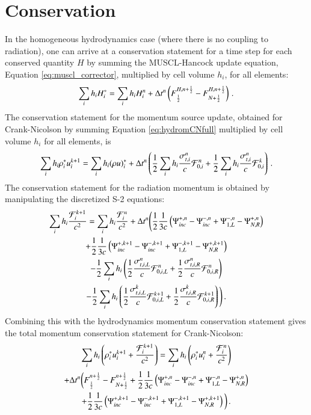 \section{Conservation}
In the homogeneous hydrodynamics case (where there is no coupling to radiation),
one can arrive at a conservation statement for a time step for each conserved
quantity $H$ by summing the MUSCL-Hancock update equation, Equation
\eqref{eq:muscl_corrector}, multiplied by cell volume $h_i$, for all elements:
\begin{equation}
   \sum\limits_i h_i H_i^* = \sum\limits_i h_i H_i^n
   + \Delta t^n\left(F_{\frac{1}{2}}^{H,n+\frac{1}{2}} - F_{N+\frac{1}{2}}^{H,n+\frac{1}{2}}\right) \, .
\end{equation}
The conservation statement for the momentum source update, obtained for
Crank-Nicolson by summing Equation \eqref{eq:hydromCNfull} multiplied by cell
volume $h_i$ for all elements, is
\begin{equation}
   \sum\limits_i h_i \rho_i^* u_i^{k+1} = \sum\limits_i h_i (\rho u)_i^*
   +\Delta t^n\left(
   \frac{1}{2}\sum\limits_i h_i \frac{\sigma_{t,i}^n}{c}\mathcal{F}_{0,i}^n
   + \frac{1}{2}\sum\limits_i h_i \frac{\sigma_{t,i}^n}{c}\mathcal{F}_{0,i}^k
   \right) \, .
\end{equation}
The conservation statement for the radiation momentum is obtained by
manipulating the discretized S-2 equations:
\begin{multline}
   \sum\limits_i h_i \frac{\mathcal{F}_i^{k+1}}{c^2} = \sum\limits_i h_i \frac{\mathcal{F}_i^n}{c^2}
   + \Delta t^n\Bigg(
   \frac{1}{2}\frac{1}{3c}\left( \Psi^{+,n}_{inc} - \Psi^{-,n}_{inc}
   + \Psi^{-,n}_{1,L} - \Psi^{+,n}_{N,R} \right)\\
   + \frac{1}{2}\frac{1}{3c}\left( \Psi^{+,k+1}_{inc} - \Psi^{-,k+1}_{inc}
   + \Psi^{-,k+1}_{1,L} - \Psi^{+,k+1}_{N,R} \right)\\
   - \frac{1}{2}\sum\limits_i h_i\left( \frac{1}{2}\frac{\sigma_{t,i,L}^n}{c}\mathcal{F}_{0,i,L}^n
   + \frac{1}{2}\frac{\sigma_{t,i,R}^n}{c}\mathcal{F}_{0,i,R}^n \right)\\
   - \frac{1}{2}\sum\limits_i h_i\left( \frac{1}{2}\frac{\sigma_{t,i,L}^k}{c}\mathcal{F}_{0,i,L}^{k+1}
   + \frac{1}{2}\frac{\sigma_{t,i,R}^k}{c}\mathcal{F}_{0,i,R}^{k+1} \right)
   \Bigg) \, .
\end{multline}
Combining this with the hydrodynamics momentum conservation statement
gives the total momentum conservation statement for Crank-Nicolson:
\begin{multline}
   \sum\limits_i h_i\left( \rho_i^* u_i^{k+1} + \frac{\mathcal{F}_i^{k+1}}{c^2} \right) =
   \sum\limits_i h_i\left( \rho_i^* u_i^n + \frac{\mathcal{F}_i^n}{c^2} \right)\\
   + \Delta t^n\bigg(
   F_{\frac{1}{2}}^{n+\frac{1}{2}} - F_{N+\frac{1}{2}}^{n+\frac{1}{2}}
   + \frac{1}{2}\frac{1}{3c}\left( \Psi^{+,n}_{inc} - \Psi^{-,n}_{inc}
   + \Psi^{-,n}_{1,L} - \Psi^{+,n}_{N,R} \right)\\
   + \frac{1}{2}\frac{1}{3c}\left( \Psi^{+,k+1}_{inc} - \Psi^{-,k+1}_{inc}
   + \Psi^{-,k+1}_{1,L} - \Psi^{+,k+1}_{N,R} \right)
   \bigg) \, .
\end{multline}
